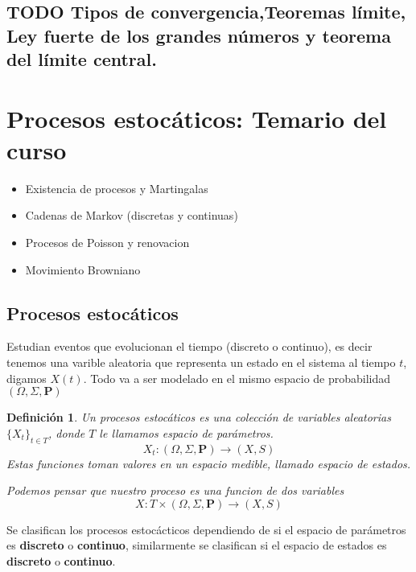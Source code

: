 \documentclass[letterpaper]{article}
\newtheorem{def.}{Definici\'on}[section]
\begin{document}
\subsection{{\bfseries\sffamily TODO} Tipos de convergencia,Teoremas límite, Ley fuerte de los grandes números y teorema del límite central.}
\label{sec:org4e146da}

\section{Procesos estocáticos: Temario del curso}
\label{sec:org5f4bc1e}

\begin{itemize}
\item Existencia de procesos y Martingalas
\item Cadenas de Markov (discretas y continuas)
\item Procesos de Poisson y renovacion
\item Movimiento Browniano
\end{itemize}

\subsection{Procesos estocáticos}
\label{sec:orgbffff96}
Estudian eventos que evolucionan el tiempo (discreto o continuo), es decir tenemos una varible aleatoria que representa un estado en el sistema al tiempo \(t\), digamos \(X(t)\). Todo va a ser modelado en el mismo espacio de probabilidad \((\Omega,\Sigma,\textbf{P})\)
\begin{def.}
Un procesos estocáticos es una colección de variables aleatorias \(\{X_{t}\}_{t\in T}\), donde \(T\) le llamamos \emph{espacio de parámetros}.
\[
    X_{t}:(\Omega,\Sigma,\textbf{P})\rightarrow(X,S)
\]
Estas funciones toman valores en un espacio medible, llamado \emph{espacio de estados}.

Podemos pensar que nuestro proceso es una funcion de dos variables
\[
    X:T\times(\Omega,\Sigma,\textbf{P})\rightarrow(X,S)
\]
\end{def.}
Se clasifican los procesos estocácticos dependiendo de si el espacio de parámetros es \textbf{discreto} o \textbf{continuo}, similarmente se clasifican si el espacio de estados es \textbf{discreto} o \textbf{continuo}.
\end{document}
